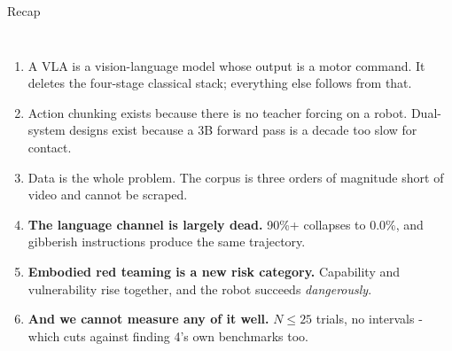 \documentclass[aspectratio=169]{beamer}
\begin{document}
\begin{frame}{Recap}
  \small
  \begin{columns}[T]
    \begin{enumerate}\scriptsize\itemsep 3pt
      \item A VLA is a vision-language model whose output is a motor command. It deletes the
        four-stage classical stack; everything else follows from that.
      \item Action chunking exists because there is no teacher forcing on a robot.
        Dual-system designs exist because a 3B forward pass is a decade too slow for contact.
      \item Data is the whole problem. The corpus is three orders of magnitude short of
        video and cannot be scraped.
      \item \textbf{The language channel is largely dead.} 90\%+ collapses to 0.0\%, and
        gibberish instructions produce the same trajectory.
      \item \textbf{Embodied red teaming is a new risk category.} Capability and
        vulnerability rise together, and the robot succeeds \emph{dangerously}.
      \item \textbf{And we cannot measure any of it well.} $N \le 25$ trials, no intervals -
        which cuts against finding 4's own benchmarks too.
    \end{enumerate}
    \vskip 4pt
    \vskip 4pt
  \end{columns}
\end{frame}
\end{document}
